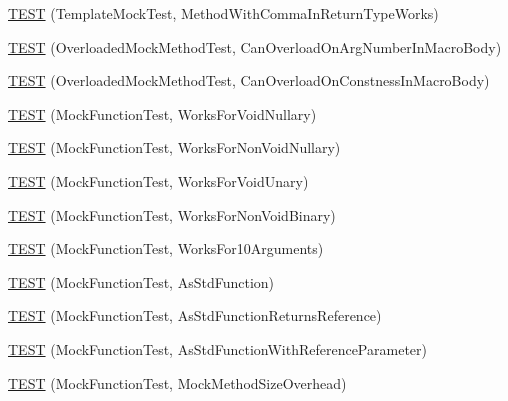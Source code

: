 \begin{DoxyCompactItemize}
\mbox{\hyperlink{namespacetesting_1_1gmock__generated__function__mockers__test_aa998c7e5e8b6fd378cacb53663e8c4a6}{T\+E\+ST}} (Template\+Mock\+Test, Method\+With\+Comma\+In\+Return\+Type\+Works)
\item 
\mbox{\hyperlink{namespacetesting_1_1gmock__generated__function__mockers__test_a6542d3ae3f153907c32f3cf15a2ff6cf}{T\+E\+ST}} (Overloaded\+Mock\+Method\+Test, Can\+Overload\+On\+Arg\+Number\+In\+Macro\+Body)
\item 
\mbox{\hyperlink{namespacetesting_1_1gmock__generated__function__mockers__test_aa58ec93a77bee21244c10da2bc8cf70e}{T\+E\+ST}} (Overloaded\+Mock\+Method\+Test, Can\+Overload\+On\+Constness\+In\+Macro\+Body)
\item 
\mbox{\hyperlink{namespacetesting_1_1gmock__generated__function__mockers__test_a8d67aadbc04fee7e2afc10ee91a76b74}{T\+E\+ST}} (Mock\+Function\+Test, Works\+For\+Void\+Nullary)
\item 
\mbox{\hyperlink{namespacetesting_1_1gmock__generated__function__mockers__test_a90817999d7f25ecf280453efb157db84}{T\+E\+ST}} (Mock\+Function\+Test, Works\+For\+Non\+Void\+Nullary)
\item 
\mbox{\hyperlink{namespacetesting_1_1gmock__generated__function__mockers__test_ab0e1ede6a1f6ef1774e27f5793a33599}{T\+E\+ST}} (Mock\+Function\+Test, Works\+For\+Void\+Unary)
\item 
\mbox{\hyperlink{namespacetesting_1_1gmock__generated__function__mockers__test_ab6337da98bc6bc97100ab177386f3b2b}{T\+E\+ST}} (Mock\+Function\+Test, Works\+For\+Non\+Void\+Binary)
\item 
\mbox{\hyperlink{namespacetesting_1_1gmock__generated__function__mockers__test_aa92f0b2b98d76f2c881103a19bed7ba6}{T\+E\+ST}} (Mock\+Function\+Test, Works\+For10\+Arguments)
\item 
\mbox{\hyperlink{namespacetesting_1_1gmock__generated__function__mockers__test_a4dc4e74817748ff20dc5367eb83caee3}{T\+E\+ST}} (Mock\+Function\+Test, As\+Std\+Function)
\item 
\mbox{\hyperlink{namespacetesting_1_1gmock__generated__function__mockers__test_a02a409f824b52ad582af0291e8ae5ca1}{T\+E\+ST}} (Mock\+Function\+Test, As\+Std\+Function\+Returns\+Reference)
\item 
\mbox{\hyperlink{namespacetesting_1_1gmock__generated__function__mockers__test_a3bf6815500ac1b9f2558c0bee2b72497}{T\+E\+ST}} (Mock\+Function\+Test, As\+Std\+Function\+With\+Reference\+Parameter)
\item 
\mbox{\hyperlink{namespacetesting_1_1gmock__generated__function__mockers__test_af89476eb6775c51ca67e398d06c35d43}{T\+E\+ST}} (Mock\+Function\+Test, Mock\+Method\+Size\+Overhead)
\end{DoxyCompactItemize}



